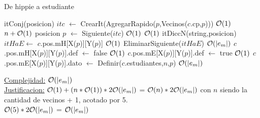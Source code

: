 \begin{Algoritmos}
\begin{algorithm}[H]
\caption{De hippie a estudiante}
\begin{algorithmic}[1]
	\State itConj(posicion) $itc$ $\gets$ CrearIt(AgregarRapido($p$,Vecinos($c$.cp,$p$))) \Comment $\mathcal{O}(1)$
	 \Comment $n + \mathcal{O}(1)$
	\State posicion $p$ $\gets$ Siguiente($itc$) \Comment $\mathcal{O}(1)$
	 \Comment $\mathcal{O}(1)$
		\State itDiccN(string,posicion) $itHaE \gets$ $c$.pos.mH[X($p$)][Y($p$)] \Comment $\mathcal{O}(1)$
		\State EliminarSiguiente($itHaE$) \Comment $\mathcal{O}(|e_m|)$
		\State $c$.pos.mH[X($p$)][Y($p$)].def $\gets$ false \Comment $\mathcal{O}(1)$
		\State $c$.pos.mE[X($p$)][Y($p$)].def $\gets$ true \Comment $\mathcal{O}(1)$
		\State $c$.pos.mE[X($p$)][Y($p$)].dato $\gets$ Definir($c$.estudiantes,$n$,$p$) \Comment $\mathcal{O}(|e_m|)$
	\EndIf
	\EndWhile
	\EndProcedure
\end{algorithmic}
\underline{Complejidad:} $\mathcal{O}(|e_m|)$\\
\underline{Justificacion:} $\mathcal{O}(1) + (n*\mathcal{O}(1))* 2\mathcal{O}(|e_m|)$ = $\mathcal{O}(n)*2\mathcal{O}(|e_m|)$ con $n$ siendo la cantidad de vecinos + 1, acotado por 5. \\
$\mathcal{O}(5)*2\mathcal{O}(|e_m|)$ = $\mathcal{O}(|e_m|)$
\end{algorithm}




\end{Algoritmos}
